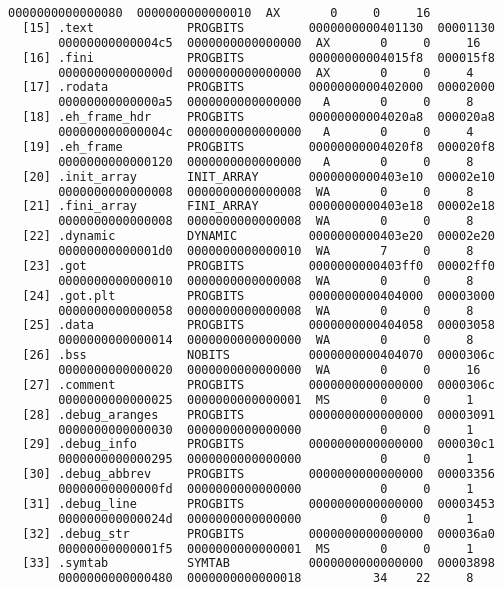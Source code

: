 \begin{lstlisting}[language=bash, caption={List of ELF section headers with readelf tool of a program compiled with GCC.}, label={code:elf_sections}]
       0000000000000080  0000000000000010  AX       0     0     16
  [15] .text             PROGBITS         0000000000401130  00001130
       00000000000004c5  0000000000000000  AX       0     0     16
  [16] .fini             PROGBITS         00000000004015f8  000015f8
       000000000000000d  0000000000000000  AX       0     0     4
  [17] .rodata           PROGBITS         0000000000402000  00002000
       00000000000000a5  0000000000000000   A       0     0     8
  [18] .eh_frame_hdr     PROGBITS         00000000004020a8  000020a8
       000000000000004c  0000000000000000   A       0     0     4
  [19] .eh_frame         PROGBITS         00000000004020f8  000020f8
       0000000000000120  0000000000000000   A       0     0     8
  [20] .init_array       INIT_ARRAY       0000000000403e10  00002e10
       0000000000000008  0000000000000008  WA       0     0     8
  [21] .fini_array       FINI_ARRAY       0000000000403e18  00002e18
       0000000000000008  0000000000000008  WA       0     0     8
  [22] .dynamic          DYNAMIC          0000000000403e20  00002e20
       00000000000001d0  0000000000000010  WA       7     0     8
  [23] .got              PROGBITS         0000000000403ff0  00002ff0
       0000000000000010  0000000000000008  WA       0     0     8
  [24] .got.plt          PROGBITS         0000000000404000  00003000
       0000000000000058  0000000000000008  WA       0     0     8
  [25] .data             PROGBITS         0000000000404058  00003058
       0000000000000014  0000000000000000  WA       0     0     8
  [26] .bss              NOBITS           0000000000404070  0000306c
       0000000000000020  0000000000000000  WA       0     0     16
  [27] .comment          PROGBITS         0000000000000000  0000306c
       0000000000000025  0000000000000001  MS       0     0     1
  [28] .debug_aranges    PROGBITS         0000000000000000  00003091
       0000000000000030  0000000000000000           0     0     1
  [29] .debug_info       PROGBITS         0000000000000000  000030c1
       0000000000000295  0000000000000000           0     0     1
  [30] .debug_abbrev     PROGBITS         0000000000000000  00003356
       00000000000000fd  0000000000000000           0     0     1
  [31] .debug_line       PROGBITS         0000000000000000  00003453
       000000000000024d  0000000000000000           0     0     1
  [32] .debug_str        PROGBITS         0000000000000000  000036a0
       00000000000001f5  0000000000000001  MS       0     0     1
  [33] .symtab           SYMTAB           0000000000000000  00003898
       0000000000000480  0000000000000018          34    22     8

\end{lstlisting}
